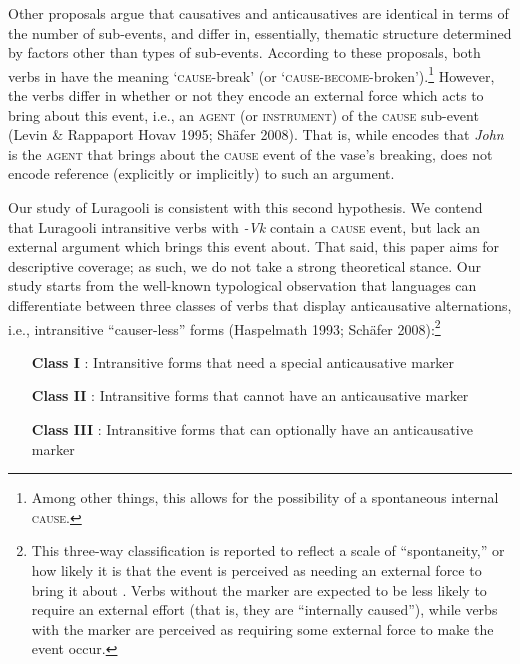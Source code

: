 \documentclass[output=paper]{langsci/langscibook}
\begin{document}
Other proposals argue that causatives and anticausatives are identical in terms of the number of sub-events, and differ in, essentially, thematic structure determined by factors other than types of sub-events. According to these proposals, both verbs in  have the meaning ‘\textsc{cause}-break’ (or ‘\textsc{cause-become}-broken’).\footnote{ Among other things, this allows for the possibility of a spontaneous internal \textsc{cause.}} However, the verbs differ in whether or not they encode an external force which acts to bring about this event, i.e., an \textsc{agent (}or \textsc{instrument}) of the \textsc{cause} sub-event (Levin \& Rappaport Hovav 1995; Shäfer 2008). That is, while  encodes that \textit{John }is the\textsc{ agent} that brings about the \textsc{cause} event of the vase’s breaking,  does not encode reference (explicitly or implicitly) to such an argument. 

  Our study of Luragooli is consistent with this second hypothesis. We contend that Luragooli intransitive verbs with \textit{-Vk} contain a \textsc{cause} event, but lack an external argument which brings this event about. That said, this paper aims for descriptive coverage; as such, we do not take a strong theoretical stance. Our study starts from the well-known typological observation that languages can differentiate between three classes of verbs that display anticausative alternations, i.e., intransitive “causer-less” forms (Haspelmath 1993; Schäfer 2008):\footnote{ This three-way classification is reported to reflect a scale of “spontaneity,” or how likely it is that the event is perceived as needing an external force to bring it about \citep{Haspelmath1993}. Verbs without the marker are expected to be less likely to require an external effort (that is, they are “internally caused”), while verbs with the marker are perceived as requiring some external force to make the event occur. }
\begin{itemize}
     \item[\textbf{  Class I}]: Intransitive forms that need a special anticausative marker\
     \item[\textbf{  Class II}]: Intransitive forms that cannot have an anticausative marker\\
     \item[\textbf{  Class III}]: Intransitive forms that can optionally have an anticausative marker\\ 
\end{itemize}
\end{document}
